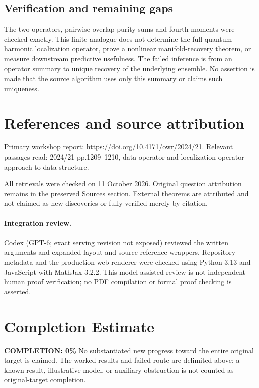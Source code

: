 \documentclass[11pt]{article}
\begin{document}
\subsection{Verification and remaining gaps}
The two operators, pairwise-overlap purity sums and fourth moments were checked exactly. This finite analogue does not determine the full quantum-harmonic localization operator, prove a nonlinear manifold-recovery theorem, or measure downstream predictive usefulness. The failed inference is from an operator summary to unique recovery of the underlying ensemble. No assertion is made that the source algorithm uses only this summary or claims such uniqueness.

\section{References and source attribution}
Primary workshop report: \url{https://doi.org/10.4171/owr/2024/21}. Relevant passages read: 2024/21 pp.1209--1210, data-operator and localization-operator approach to data structure.

All retrievals were checked on 11 October 2026. Original question attribution remains in the preserved Sources section. External theorems are attributed and not claimed as new discoveries or fully verified merely by citation.


\paragraph{Integration review.} Codex (GPT-6; exact serving revision not exposed) reviewed the written arguments and expanded layout and source-reference wrappers. Repository metadata and the production web renderer were checked using Python 3.13 and JavaScript with MathJax 3.2.2. This model-assisted review is not independent human proof verification; no PDF compilation or formal proof checking is asserted.

\section{Completion Estimate}
\noindent\textbf{COMPLETION: 0\%}
No substantiated new progress toward the entire original target is claimed. The worked results and failed route are delimited above; a known result, illustrative model, or auxiliary obstruction is not counted as original-target completion.
\end{document}
